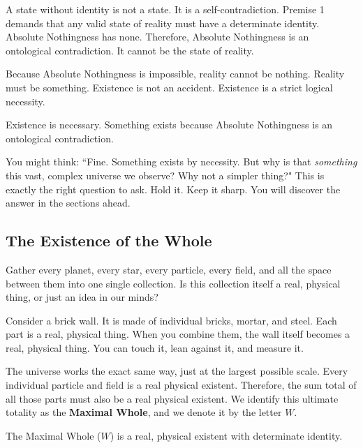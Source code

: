 \documentclass[11pt]{article}
\theoremstyle{canonstyle}
\begin{document}
A state without identity is not a state. It is a self-contradiction. Premise 1 demands that any valid state of reality must have a determinate identity. Absolute Nothingness has none. Therefore, Absolute Nothingness is an ontological contradiction. It cannot be the state of reality.

Because Absolute Nothingness is impossible, reality cannot be nothing. Reality must be something. Existence is not an accident. Existence is a strict logical necessity.

\begin{keyresult}
Existence is necessary. Something exists because Absolute Nothingness is an ontological contradiction.
\end{keyresult}

You might think: ``Fine. Something exists by necessity. But why is that \emph{something} this vast, complex universe we observe? Why not a simpler thing?" This is exactly the right question to ask. Hold it. Keep it sharp. You will discover the answer in the sections ahead.

\subsection{The Existence of the Whole}

\begin{reflect}
Gather every planet, every star, every particle, every field, and all the space between them into one single collection. Is this collection itself a real, physical thing, or just an idea in our minds?
\end{reflect}

Consider a brick wall. It is made of individual bricks, mortar, and steel. Each part is a real, physical thing. When you combine them, the wall itself becomes a real, physical thing. You can touch it, lean against it, and measure it. 

The universe works the exact same way, just at the largest possible scale. Every individual particle and field is a real physical existent. Therefore, the sum total of all those parts must also be a real physical existent. We identify this ultimate totality as the \textbf{Maximal Whole}, and we denote it by the letter $W$.

\begin{keyresult}
The Maximal Whole ($W$) is a real, physical existent with determinate identity.
\end{keyresult}
\end{document}
